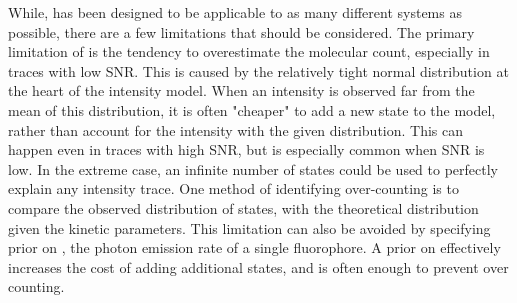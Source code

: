 While, \ours has been designed to be applicable to as many different systems as possible, there are a few limitations that should be considered.
    The primary limitation of \ours is the tendency to overestimate the molecular count, especially in traces with low SNR. 
    This is caused by the relatively tight normal distribution at the heart of the intensity model. 
    When an intensity is observed far from the mean of this distribution, it is often "cheaper" to add a new state to the model, 
    rather than account for the intensity with the given distribution. 
    This can happen even in traces with high SNR, but is especially common when SNR is low. 
    In the extreme case, an infinite number of states could be used to perfectly explain any intensity trace.
    One method of identifying over-counting is to compare the observed distribution of states, with the theoretical distribution given the kinetic parameters. %
    This limitation can also be avoided by specifying prior on \re, the photon emission rate of a single fluorophore. 
    A prior on \re effectively increases the cost of adding additional states, and is often enough to prevent over counting. 


